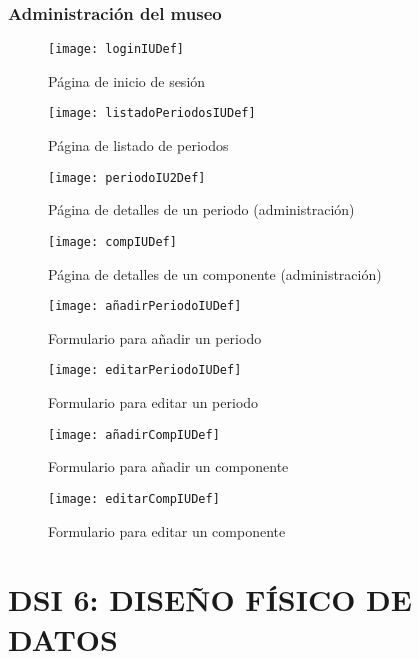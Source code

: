 \subsubsection{Administración del museo}
\begin{figure}[H]
\centering
\texttt{[image: loginIUDef]}
\caption{Página de inicio de sesión}
\end{figure}
\begin{figure}[H]
\centering
\texttt{[image: listadoPeriodosIUDef]}
\caption{Página de listado de periodos}
\end{figure}
\begin{figure}[H]
\centering
\texttt{[image: periodoIU2Def]}
\caption{Página de detalles de un periodo (administración)}
\end{figure}
\begin{figure}[H]
\centering
\texttt{[image: compIUDef]}
\caption{Página de detalles de un componente (administración)}
\end{figure}
\begin{figure}[H]
\centering
\texttt{[image: añadirPeriodoIUDef]}
\caption{Formulario para añadir un periodo}
\end{figure}
\begin{figure}[H]
\centering
\texttt{[image: editarPeriodoIUDef]}
\caption{Formulario para editar un periodo}
\end{figure}
\begin{figure}[H]
\centering
\texttt{[image: añadirCompIUDef]}
\caption{Formulario para añadir un componente}
\end{figure}
\begin{figure}[H]
\centering
\texttt{[image: editarCompIUDef]}
\caption{Formulario para editar un componente}
\end{figure}



\newpage
\section{DSI 6: DISEÑO FÍSICO DE DATOS}

